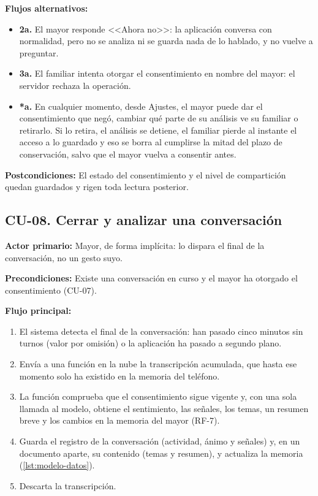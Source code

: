 \noindent\textbf{Flujos alternativos:}
\begin{itemize}[nosep]
    \item \textbf{2a.} El mayor responde <<Ahora no>>: la aplicación conversa con normalidad, pero no se analiza ni se guarda nada de lo hablado, y no vuelve a preguntar.
    \item \textbf{3a.} El familiar intenta otorgar el consentimiento en nombre del mayor: el servidor rechaza la operación.
    \item \textbf{*a.} En cualquier momento, desde Ajustes, el mayor puede dar el consentimiento que negó, cambiar qué parte de su análisis ve su familiar o retirarlo. Si lo retira, el análisis se detiene, el familiar pierde al instante el acceso a lo guardado y eso se borra al cumplirse la mitad del plazo de conservación, salvo que el mayor vuelva a consentir antes.
\end{itemize}

\noindent\textbf{Postcondiciones:} El estado del consentimiento y el nivel de compartición quedan guardados y rigen toda lectura posterior.

\bigskip

\subsection*{CU-08. Cerrar y analizar una conversación}

\noindent\textbf{Actor primario:} Mayor, de forma implícita: lo dispara el final de la conversación, no un gesto suyo.

\noindent\textbf{Precondiciones:} Existe una conversación en curso y el mayor ha otorgado el consentimiento (CU-07).

\noindent\textbf{Flujo principal:}
\begin{enumerate}[nosep]
    \item El sistema detecta el final de la conversación: han pasado cinco minutos sin turnos (valor por omisión) o la aplicación ha pasado a segundo plano.
    \item Envía a una función en la nube la transcripción acumulada, que hasta ese momento solo ha existido en la memoria del teléfono.
    \item La función comprueba que el consentimiento sigue vigente y, con una sola llamada al modelo, obtiene el sentimiento, las señales, los temas, un resumen breve y los cambios en la memoria del mayor (RF-7).
    \item Guarda el registro de la conversación (actividad, ánimo y señales) y, en un documento aparte, su contenido (temas y resumen), y actualiza la memoria (\autoref{lst:modelo-datos}).
    \item Descarta la transcripción.
\end{enumerate}

